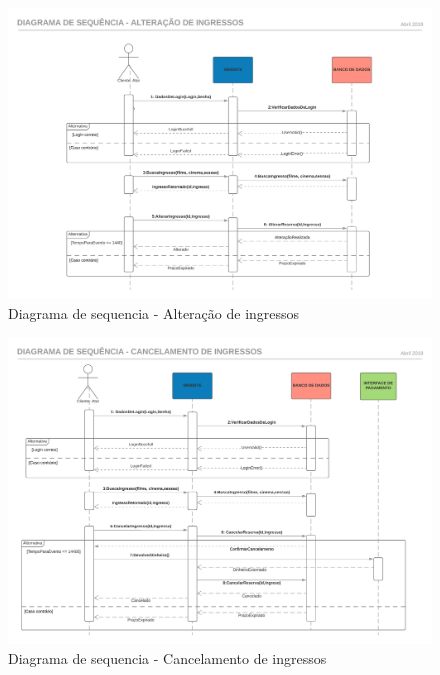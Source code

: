 \documentclass[12pt]{article}
\begin{document}
    \begin{figure}[h]
        \centering
        \includegraphics[scale=0.5]{./Imagens/DiagramasDeSequencia/DiagramaDeSequencia2.png}
        \caption{Diagrama de sequencia - Alteração de ingressos}
        \label{fig:DiagramaSequencia02}
    \end{figure}
   
    \begin{figure}[h]
        \centering
        \includegraphics[scale=0.45]{./Imagens/DiagramasDeSequencia/DiagramaDeSequencia3.png}
        \caption{Diagrama de sequencia - Cancelamento de ingressos}
        \label{fig:DiagramaSequencia03}
    \end{figure}
\end{document}
